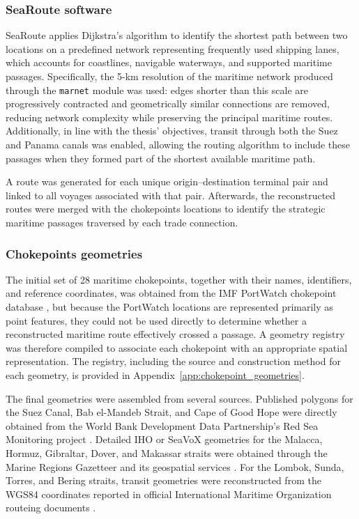 \documentclass[pdftex,12pt,openright,a4paper,oneside]{book}
\begin{document}
\subsubsection{SeaRoute software}
\label{subsubsec:searoute_software}
SeaRoute applies Dijkstra's algorithm \citep{dijkstra1959} to identify the shortest path between two locations on a predefined network representing frequently used shipping lanes, which accounts for coastlines, navigable waterways, and supported maritime passages.
Specifically, the 5-km resolution of the maritime network produced through the \texttt{marnet} module was used: edges shorter than this scale are progressively contracted and geometrically similar connections are removed, reducing network complexity while preserving the principal maritime routes.
Additionally, in line with the thesis' objectives, transit through both the Suez and Panama canals was enabled, allowing the routing algorithm to include these passages when they formed part of the shortest available maritime path.

A route was generated for each unique origin--destination terminal pair and linked to all voyages associated with that pair. 
Afterwards, the reconstructed routes were merged with the chokepoints locations to identify the strategic maritime passages traversed by each trade connection.

\subsubsection{Chokepoints geometries}
\label{subsubsec:chokepoints_geom}
The initial set of 28 maritime chokepoints, together with their names, identifiers, and reference coordinates, was obtained from the IMF PortWatch chokepoint database \citep{imf_portwatch}, but because the PortWatch locations are represented primarily as point features, they could not be used directly to determine whether a reconstructed maritime route effectively crossed a passage.
A geometry registry was therefore compiled to associate each chokepoint with an appropriate spatial representation. 
The registry, including the source and construction method for each geometry, is provided in Appendix~\ref{app:chokepoint_geometries}.

The final geometries were assembled from several sources. Published polygons for the Suez Canal, Bab el-Mandeb Strait, and Cape of Good Hope were directly obtained from the World Bank Development Data Partnership's Red Sea Monitoring project \citep{worldbank_redsea}. 
Detailed IHO or SeaVoX geometries for the Malacca, Hormuz, Gibraltar, Dover, and Makassar straits were obtained through the Marine Regions Gazetteer and its geospatial services \citep{marine_regions}. 
For the Lombok, Sunda, Torres, and Bering straits, transit geometries were reconstructed from the WGS84 coordinates reported in official International Maritime Organization routeing documents \citep{imo_colreg74, imo_sn1_326, imo_bering_routeing}. 
\end{document}
